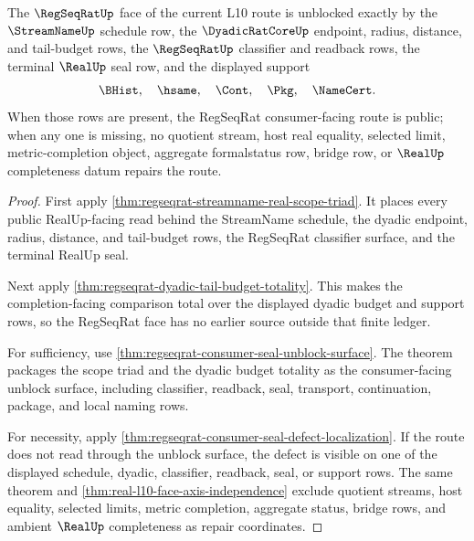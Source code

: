 \begin{theorem}
\label{thm:regseqrat-scope-unblock}
The $\RegSeqRatUp$ face of the current L10 route is unblocked exactly by the
$\StreamNameUp$ schedule row, the $\DyadicRatCoreUp$ endpoint, radius,
distance, and tail-budget rows, the $\RegSeqRatUp$ classifier and readback
rows, the terminal $\RealUp$ seal row, and the displayed support
$$
\BHist,\quad \hsame,\quad \Cont,\quad \Pkg,\quad \NameCert.
$$
When those rows are present, the RegSeqRat consumer-facing route is public;
when any one is missing, no quotient stream, host real equality, selected
limit, metric-completion object, aggregate formalstatus row, bridge row, or
$\RealUp$ completeness datum repairs the route.
\end{theorem}
\begin{proof}
First apply \autoref{thm:regseqrat-streamname-real-scope-triad}. It places
every public RealUp-facing read behind the StreamName schedule, the dyadic
endpoint, radius, distance, and tail-budget rows, the RegSeqRat classifier
surface, and the terminal RealUp seal.

Next apply \autoref{thm:regseqrat-dyadic-tail-budget-totality}. This makes the
completion-facing comparison total over the displayed dyadic budget and
support rows, so the RegSeqRat face has no earlier source outside that finite
ledger.

For sufficiency, use \autoref{thm:regseqrat-consumer-seal-unblock-surface}.
The theorem packages the scope triad and the dyadic budget totality as the
consumer-facing unblock surface, including classifier, readback, seal,
transport, continuation, package, and local naming rows.

For necessity, apply \autoref{thm:regseqrat-consumer-seal-defect-localization}.
If the route does not read through the unblock surface, the defect is visible
on one of the displayed schedule, dyadic, classifier, readback, seal, or
support rows. The same theorem and \autoref{thm:real-l10-face-axis-independence}
exclude quotient streams, host equality, selected limits, metric completion,
aggregate status, bridge rows, and ambient $\RealUp$ completeness as repair
coordinates.
\end{proof}
